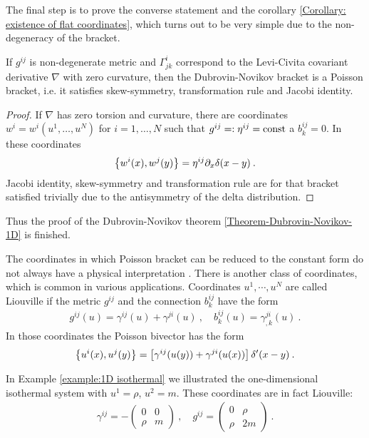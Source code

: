 The final step is to prove the converse statement and the corollary \vref{Corollary: existence of flat coordinates}, which turns out to be very simple due to the non-degeneracy of the bracket. 

\begin{lemma}
    If $g^{ij}$ is non-degenerate metric and $\Gamma^i_{jk}$ correspond to the Levi-Civita covariant derivative $\nabla$ with zero curvature, then the Dubrovin-Novikov bracket is a Poisson bracket, i.e. it satisfies skew-symmetry, transformation rule and Jacobi identity.
\end{lemma}

\begin{proof}
    If $\nabla$ has zero torsion and curvature, there are coordinates\\ $w^i=w^i(u^1,\dots,u^N)$ for $i=1,\dots,N$ such that $g^{ij} =: \eta^{ij} =\mathrm{const}$ a $b^{ij}_k = 0$. In these coordinates
    \begin{align}
        \left \lbrace w^i(x),w^j(y) \right \rbrace = \eta^{ij} \partial_x \delta(x-y) \:.
    \end{align}
    Jacobi identity, skew-symmetry and transformation rule are for that bracket satisfied trivially due to the antisymmetry of the delta distribution.
\end{proof}
Thus the proof of the Dubrovin-Novikov theorem \vref{Theorem-Dubrovin-Novikov-1D} is finished.

The coordinates in which Poisson bracket can be reduced to the constant form do not always have a physical interpretation \cite{Dubrovin-Novikov}. There is another class of coordinates, which is common in various applications. Coordinates $u^1, \cdots, u^N$ are called Liouville if the metric $g^{ij}$ and the connection $b^{ij}_k$ have the form
\begin{align}
    g^{ij}(u) = \gamma^{ij}(u)+ \gamma^{ji}(u) \:, \quad b^{ij}_k(u) = \gamma^{ji}_{,k}(u) \:. 
\end{align}
In those coordinates the Poisson bivector has the form
\begin{align}
    \left \lbrace u^i(x),u^j(y) \right \rbrace = \left[ \gamma^{ij}(u(y)) + \gamma^{ji}(u(x)) \right] \delta'(x-y) \:.
\end{align}

\begin{example}
    In Example \vref{example:1D isothermal} we illustrated the one-dimensional isothermal system with $u^1 = \rho$, $u^2 = m$. These coordinates are in fact Liouville:
    \begin{align}
        \gamma^{ij} = -\begin{pmatrix}
            0 & 0 \\
            \rho & m
        \end{pmatrix} \:, \quad
        g^{ij} = \begin{pmatrix}
            0 & \rho \\
            \rho & 2m 
        \end{pmatrix} \:.
    \end{align}
\end{example}


